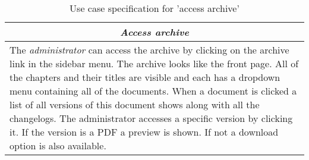 \begin{table}[H]
\centering
\begin{tabular}{p{14.5cm}}
\hline
\multicolumn{1}{c}{\textit{\textbf{Access archive}}} \\
\hline
The \textit{administrator} can access the archive by clicking on the archive link in the sidebar menu.
The archive looks like the front page.
All of the chapters and their titles are visible and each has a dropdown menu containing all of the documents.
When a document is clicked a list of all versions of this document shows along with all the changelogs.
The administrator accesses a specific version by clicking it.
If the version is a PDF a preview is shown.
If not a download option is also available.
\\\hline
\end{tabular}
\caption{Use case specification for 'access archive'}\label{tab:archive}
\end{table}
